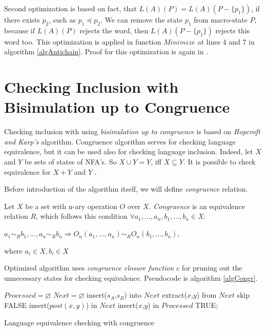 Second optimization is based on fact, that $L(A)(P)=L(A)(P-\{p_1\})$, if there exists $p_2$, such as $p_1 \preceq p_2$. We can remove the state $p_1$ 
from macro-state $P$, because if $L(A)(P)$ rejects the word, then $L(A)(P-\{p_1\})$ rejects this word too. This optimization is applied in function $Minimize$ at
lines 4 and 7 in algorithm \ref{algAntichain}. Proof for this optimization is again in \cite{tacas10}.

\section{Checking Inclusion with Bisimulation up to Congruence}
	Checking inclusion with using \emph{bisimulation up to congruence} is based on \emph{Hopcroft and Karp's} algorithm. Congruence 
	algorithm serves for checking language equivalence, but it can
	be used also for checking language inclusion. Indeed, let $X$ and $Y$ be sets of states of NFA's. 
	So $X \cup Y= Y$,
	iff $X \subseteq Y $. It is possible to check equivalence for $X+Y$ and $Y$ \cite{popl13}.

	Before introduction of the algorithm itself, we will define \emph{congruence} relation.
	\begin{definition}
		Let $X$ be a set with n-ary operation $O$ over $X$. \emph{Congruence} is an equivalence relation $R$, 
	which follows this condition $\forall a_1,\ldots,a_n,b_1,\ldots,b_n\in X$:
		\begin{description}
			\item $a_1 \sim_{R} b_1,\ldots,a_n \sim_{R} b_n \Rightarrow O_n(a_1,\ldots,a_n) \sim_{R} O_n(b_1,\ldots,b_n)$,
		\end{description}
		where $a_i \in X, b_i \in X$
	\end{definition}

	Optimized algorithm uses \emph{congruence closure function} $c$ for pruning out the unnecessary states for checking equivalence.
	Pseudocode is algorithm \ref{algCongr}.\\
	\newline
	\begin{algorithm}[h]
		\label{algCongr}
			$Processed = \varnothing$\;
			$Next = \varnothing$\;
			insert($s_A$,$s_B$) into $Next$\;
			{
				extract($x$,$y$) from $Next$\;
				{skip\;}
				{
					\Return FALSE\;
				}
					insert($post(x,y)$) in $Next$\;
				insert($x$,$y$) in $Processed$\;
			}
			\Return TRUE;
		\caption{Language equivalence checking with congruence}
\end{algorithm}

